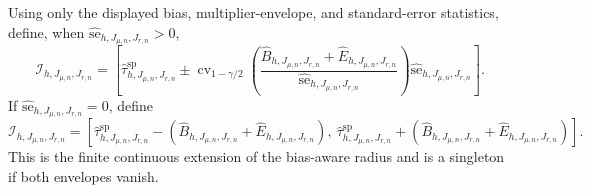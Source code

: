 Using only the displayed bias, multiplier-envelope, and standard-error statistics, define, when \(\widehat{\mathrm{se}}_{h,J_{\mu,n},J_{r,n}}>0\),
\[
\mathcal I_{h,J_{\mu,n},J_{r,n}}=\left[\widehat\tau^{\mathrm{sp}}_{h,J_{\mu,n},J_{r,n}}\pm\operatorname{cv}_{1-\gamma/2}\!\left(\frac{\widehat B_{h,J_{\mu,n},J_{r,n}}+\widehat E_{h,J_{\mu,n},J_{r,n}}}{\widehat{\mathrm{se}}_{h,J_{\mu,n},J_{r,n}}}\right)\widehat{\mathrm{se}}_{h,J_{\mu,n},J_{r,n}}\right].
\]
If \(\widehat{\mathrm{se}}_{h,J_{\mu,n},J_{r,n}}=0\), define
\[
\mathcal I_{h,J_{\mu,n},J_{r,n}}=\left[\widehat\tau^{\mathrm{sp}}_{h,J_{\mu,n},J_{r,n}}-(\widehat B_{h,J_{\mu,n},J_{r,n}}+\widehat E_{h,J_{\mu,n},J_{r,n}}),\ \widehat\tau^{\mathrm{sp}}_{h,J_{\mu,n},J_{r,n}}+(\widehat B_{h,J_{\mu,n},J_{r,n}}+\widehat E_{h,J_{\mu,n},J_{r,n}})\right].
\]
This is the finite continuous extension of the bias-aware radius and is a singleton if both envelopes vanish.